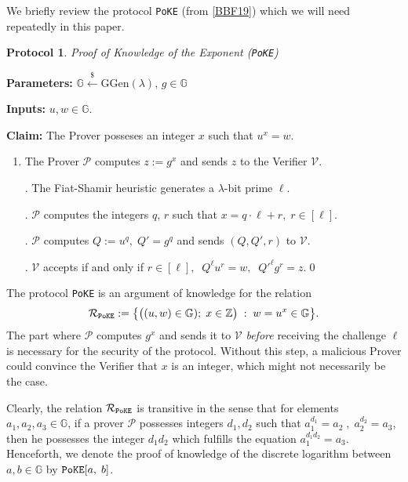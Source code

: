 \documentclass[11pt, lettersize, notitlepage, leqno, footskip=0.6cm]{article}
\newcommand{\bz}{\mathbb Z}
\newcommand{\bG}{\mathbb{G}}
\newcommand{\mc}{\mathcal}
\newcommand{\mb}{\mathbb}
\newcommand{\mr}{\mathrm}
\newcommand{\lamb}{\lambda}
\newcommand{\mP}{\mc{P}}
\newcommand{\vs}{\vspace{-0.15cm}}
\newcommand{\noin}{\noindent}
\newtheorem{Prot}[Thm]{Protocol}
\numberwithin{equation}{section}
\begin{document}
\noindent We briefly review the protocol \verb|PoKE| (from \hyperlink{BBF19}{[BBF19]}) which we will need repeatedly in this paper.

\begin{Prot} \normalfont \textit{Proof of Knowledge of the Exponent} (\verb|PoKE|) \end{Prot} \vspace{-0.3cm}

\noindent \textbf{Parameters:} $\mb{G}\xleftarrow{\$} \mr{GGen}(\lamb)$,\; $g\in \mb{G}$

\noindent \textbf{Inputs:} $u, w \in \mb{G}$.

\noindent \textbf{Claim:} The Prover posseses an integer $x$ such that $u^x = w$. 

\begin{enumerate}[wide, labelwidth=!, labelindent=0pt]\vs \item The Prover $\mc{P}$ computes $z:= g^x$ and sends $z$ to the Verifier $\mc{V}$.

. The Fiat-Shamir heuristic generates a $\lamb$-bit prime $\ell$.

. $\mc{P}$ computes the integers $q$, $r$ such that $x = q \cdot \ell+r,\; r\in [\ell].$

. $\mc{P}$ computes $Q:= u^q,\; Q' = g^q$ and sends $(Q, Q', r)$ to $\mc{V}$.

. $\mc{V}$ accepts if and only if $r\in [\ell],\;\; Q^{\ell}u^r =  w,\;\; Q'^{\ell}g^r = z. $\qed \end{enumerate}

\noin The protocol \verb|PoKE| is an argument of knowledge for the relation \vs $$\mc{R}_{\tt{PoKE}}:= \big\{\big((u,w)\in \bG);\; x\in \bz\big)\;:\; w = u^x \in \bG  \big\}.$$ The part where $\mc{P}$ computes $g^x$ and sends it to $\mc{V}$ \textit{before} receiving the challenge $\ell$ is necessary for the security of the protocol. Without this step, a malicious Prover could convince the Verifier that $x$ is an integer, which might not necessarily be the case.

Clearly, the relation $\mc{R}_{\tt{PoKE}}$ is transitive in the sense that for elements $a_1,a_2,a_3\in\mb{G}$, if a prover $\mP$ possesses integers $d_1,d_2$ such that $a_1^{d_1} = a_2\;,\;a_2^{d_2} = a_3$, then he possesses the integer $d_1d_2$ which fulfills the equation $a_1^{d_1d_2} = a_3$. Henceforth, we denote the proof of knowledge of the discrete logarithm between $a,b\in\mb{G}$ by $\verb|PoKE|[a,\;b]$.
\end{document}
